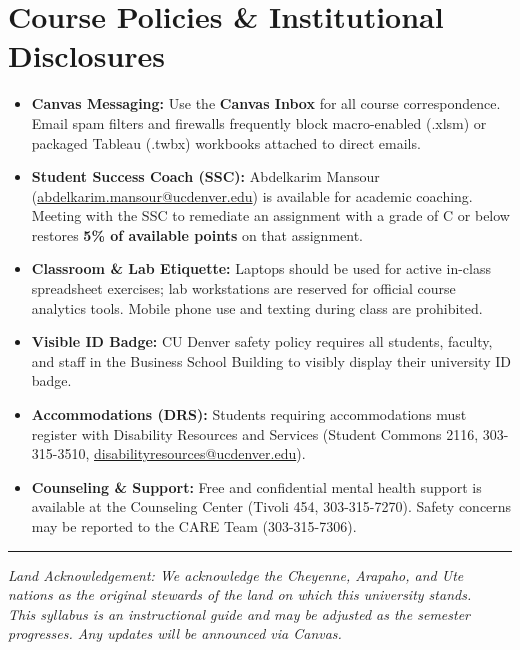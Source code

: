 \documentclass[11pt,a4paper]{article}
\begin{document}
\section*{Course Policies \& Institutional Disclosures}
\begin{itemize}[leftmargin=*]
    \item \textbf{Canvas Messaging:} Use the \textbf{Canvas Inbox} for all course correspondence. Email spam filters and firewalls frequently block macro-enabled (.xlsm) or packaged Tableau (.twbx) workbooks attached to direct emails.
    \item \textbf{Student Success Coach (SSC):} Abdelkarim Mansour (\href{mailto:abdelkarim.mansour@ucdenver.edu}{abdelkarim.mansour@ucdenver.edu}) is available for academic coaching. Meeting with the SSC to remediate an assignment with a grade of C or below restores \textbf{5\% of available points} on that assignment.
    \item \textbf{Classroom \& Lab Etiquette:} Laptops should be used for active in-class spreadsheet exercises; lab workstations are reserved for official course analytics tools. Mobile phone use and texting during class are prohibited.
    \item \textbf{Visible ID Badge:} CU Denver safety policy requires all students, faculty, and staff in the Business School Building to visibly display their university ID badge.
    \item \textbf{Accommodations (DRS):} Students requiring accommodations must register with Disability Resources and Services (Student Commons 2116, 303-315-3510, \href{mailto:disabilityresources@ucdenver.edu}{disabilityresources@ucdenver.edu}).
    \item \textbf{Counseling \& Support:} Free and confidential mental health support is available at the Counseling Center (Tivoli 454, 303-315-7270). Safety concerns may be reported to the CARE Team (303-315-7306).
\end{itemize}

\vfill
\noindent\rule{\textwidth}{0.4pt}
\small
\textit{Land Acknowledgement: We acknowledge the Cheyenne, Arapaho, and Ute nations as the original stewards of the land on which this university stands.}\\
\textit{This syllabus is an instructional guide and may be adjusted as the semester progresses. Any updates will be announced via Canvas.}
\end{document}
